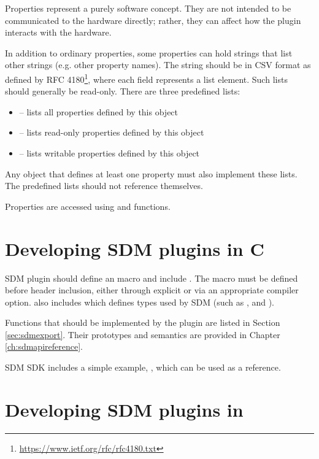 \documentclass[a4paper,12pt,twoside,extrafontsizes]{memoir}
\begin{document}
Properties represent a purely software concept. They are not intended to be communicated to the hardware directly; rather, they can affect how the plugin interacts with the hardware.

In addition to ordinary properties, some properties can hold strings that list other strings (e.g. other property names). The string should be in CSV format as defined by RFC 4180\footnote{\url{https://www.ietf.org/rfc/rfc4180.txt}}, where each field represents a list element. Such lists should generally be read-only. There are three predefined lists:

\begin{itemize}
	\item \expr{*} -- lists all properties defined by this object
	\item {} -- lists read-only properties defined by this object
	\item {} -- lists writable properties defined by this object
\end{itemize}

Any object that defines at least one property must also implement these lists. The predefined lists should not reference themselves.

Properties are accessed using  and  functions.

\section{Developing SDM plugins in C}
\label{sec:sdmpluginc}

SDM plugin should define an  macro and include . The macro must be defined before header inclusion, either through explicit  or via an appropriate compiler option.  also includes  which defines types used by SDM (such as ,  and ).

Functions that should be implemented by the plugin are listed in Section \ref{sec:sdmexport}. Their prototypes and semantics are provided in Chapter \ref{ch:sdmapireference}.

SDM SDK includes a simple example, , which can be used as a reference.

\section[Developing SDM plugins in C++]{Developing SDM plugins in \cplusplus}
\end{document}
